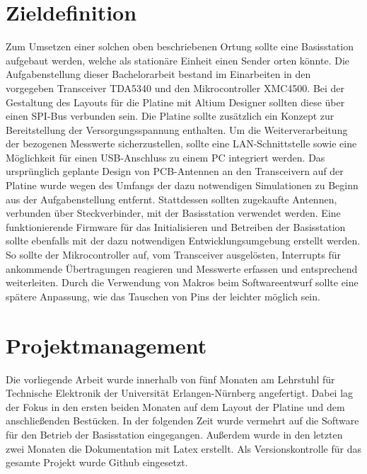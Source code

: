 \section{Zieldefinition}
Zum Umsetzen einer solchen oben beschriebenen Ortung sollte eine Basisstation aufgebaut werden, welche als stationäre Einheit einen Sender orten könnte.
Die Aufgabenstellung dieser Bachelorarbeit bestand im Einarbeiten in den vorgegeben Transceiver TDA5340 und den Mikrocontroller XMC4500. Bei der Gestaltung des Layouts für die Platine mit Altium Designer sollten diese über einen SPI-Bus verbunden sein. Die Platine sollte zusätzlich ein Konzept zur Bereitstellung der Versorgungsspannung enthalten. Um die Weiterverarbeitung der bezogenen Messwerte sicherzustellen, sollte eine LAN-Schnittstelle sowie eine Möglichkeit für einen USB-Anschluss zu einem PC integriert werden.
Das ursprünglich geplante Design von PCB-Antennen an den Transceivern auf der Platine wurde wegen des Umfangs der dazu  notwendigen Simulationen  zu Beginn aus der Aufgabenstellung entfernt. Stattdessen sollten zugekaufte Antennen, verbunden über Steckverbinder, mit der Basisstation verwendet werden.
Eine funktionierende Firmware für das Initialisieren und Betreiben der Basisstation sollte ebenfalls mit der dazu notwendigen Entwicklungsumgebung erstellt werden. So sollte der Mikrocontroller auf, vom Transceiver ausgelösten, Interrupts für ankommende Übertragungen reagieren und Messwerte erfassen und entsprechend weiterleiten. Durch die Verwendung von Makros beim Softwareentwurf sollte eine spätere Anpassung, wie das Tauschen von Pins der leichter möglich sein.


\section{Projektmanagement}
Die vorliegende Arbeit wurde innerhalb von fünf Monaten am Lehrstuhl für Technische Elektronik der Universität Erlangen-Nürnberg angefertigt. Dabei lag der Fokus in den ersten beiden Monaten auf dem Layout der Platine und dem anschließenden Bestücken. In der folgenden Zeit wurde vermehrt auf die Software für den Betrieb der Basisstation eingegangen. Außerdem wurde in den letzten zwei Monaten die Dokumentation mit Latex erstellt. Als Versionskontrolle für das gesamte Projekt wurde Github eingesetzt.
